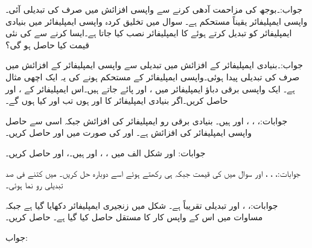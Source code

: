 جواب:۔بوجھ کی مزاحمت آدھی کرنے سے واپسی افزائش میں صرف  کی تبدیلی آئی۔واپسی ایمپلیفائر یقیناً مستحکم ہے۔
سوال  میں تخلیق کردہ واپسی ایمپلیفائر میں بنیادی ایمپلیفائر کو تبدیل کرتے ہوئے  کا ایمپلیفائر  نصب کیا جاتا ہے۔ایسا کرنے سے  کی نئی قیمت کیا حاصل ہو گی؟

جواب:۔بنیادی ایمپلیفائر کے افزائش میں  تبدیلی سے واپسی ایمپلیفائر کے افزائش میں صرف  کی تبدیلی پیدا ہوئی۔واپسی ایمپلیفائر کے مستحکم ہونے کی یہ ایک اچھی مثال ہے۔
ایک واپسی برقی دباؤ ایمپلیفائر میں ،  اور  پائے جاتے ہیں۔اس ایمپلیفائر کے ،  اور  حاصل کریں۔اگر بنیادی ایمپلیفائر کا  اور  ہوں تب  اور  کیا ہوں گے۔

جوابات:، ، ،  اور  ہیں۔
بنیادی برقی رو ایمپلیفائر کی افزائش  جبکہ اسی سے حاصل واپسی ایمپلیفائر کی افزائش  ہے۔ اور  کی صورت میں  اور  حاصل کریں۔

جوابات: اور 
شکل  الف میں ، ،  اور  ہیں۔،  اور  حاصل کریں۔

جوابات:، ، ،  اور 
سوال  میں  کی قیمت  جبکہ  ہی رکھتے ہوئے اسے دوبارہ حل کریں۔ میں کتنے فی صد تبدیلی رو نما ہوئی۔

جوابات:، ،  اور تبدیلی تقریباً   ہے۔
شکل  میں زنجیری ایمپلیفائر دکھایا گیا ہے جبکہ مساوات  میں اس کے واپس کار کا مستقل  حاصل کیا گیا ہے۔ حاصل کریں۔

جواب: 

